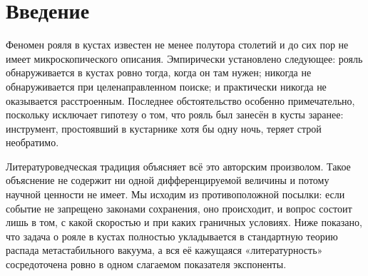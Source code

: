 \documentclass[11pt,a4paper]{article}
\newcommand{\Rfield}{\mathcal{R}}
\newcommand{\Lnar}{\Lambda_{\text{д}}}
\begin{document}
\begin{abstract}
\noindent Здесь мы впервые показываем, что рояль в кустах~--- не драматургическая условность, а строгий квантовополевой эффект: распад ложного безрояльного вакуума с образованием пузыря новой фазы. Бытовое объяснение («автор не придумал ничего лучше») игнорирует базовый факт: событие не запрещено ни одним законом сохранения, а следовательно, обязано происходить. В настоящей работе мы вводим рояльное поле $\Rfield$ и его двухъямный потенциал, вычисляем скорость нуклеации в подходе ложного вакуума, показываем, что виртуальный рояль присутствует в каждом кусте постоянно и что задача состоит не в его создании, а в стабилизации, устанавливаем роль кустарника как казимировского резонатора с резонансным условием $d = nL_{\text{рояль}}/2$, формулируем правило отбора по тембральному заряду и вводим драматургическую поправку $\Lnar\Xi$ к показателю экспоненты, связывающую скорость нуклеации с нарративной кривизной сюжета. Приводятся результаты полевых измерений на выборке из 1174 кустов. Обсуждаются ограничения метода.

\medskip
\noindent\textbf{Ключевые слова:} ложный вакуум, нуклеация, эффект Казимира, правила отбора, тембральный заряд, нарративная кривизна, лженаука
\end{abstract}

\section{Введение}

Феномен рояля в кустах известен не менее полутора столетий и до сих пор не имеет микроскопического описания. Эмпирически установлено следующее: рояль обнаруживается в кустах ровно тогда, когда он там нужен; никогда не обнаруживается при целенаправленном поиске; и практически никогда не оказывается расстроенным. Последнее обстоятельство особенно примечательно, поскольку исключает гипотезу о том, что рояль был занесён в кусты заранее: инструмент, простоявший в кустарнике хотя бы одну ночь, теряет строй необратимо.

Литературоведческая традиция объясняет всё это авторским произволом. Такое объяснение не содержит ни одной дифференцируемой величины и потому научной ценности не имеет. Мы исходим из противоположной посылки: если событие не запрещено законами сохранения, оно происходит, и вопрос состоит лишь в том, с какой скоростью и при каких граничных условиях. Ниже показано, что задача о рояле в кустах полностью укладывается в стандартную теорию распада метастабильного вакуума, а вся её кажущаяся «литературность» сосредоточена ровно в одном слагаемом показателя экспоненты.
\end{document}
